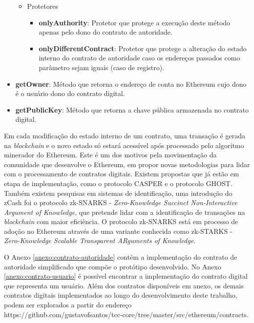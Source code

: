 \documentclass[tcc,capa]{texufpel}
\begin{document}
\begin{itemize}
\begin{itemize}
            \item Protetores
            \begin{itemize}
                \item \textbf{onlyAuthority}: Protetor que protege a execução deste método apenas pelo dono do contrato de autoridade.
                \item \textbf{onlyDifferentContract}: Protetor que protege a alteração do estado interno do contrato de autoridade caso os endereços passados como parâmetro sejam iguais (caso de registro).
            \end{itemize}
        \end{itemize}
        
        \item \textbf{getOwner}: Método que retorna o endereço de conta no Ethereum cujo dono é o usuário dono do contrato digital.
        
        \item \textbf{getPublicKey}: Método que retorna a chave pública armazenada no contrato digital.
    \end{itemize}
    
    Em cada modificação do estado interno de um contrato, uma transação é gerada na \textit{blockchain} e o novo estado só estará acessível após processado pelo algoritmo minerador do Ethereum. Este é um dos motivos pela movimentação da comunidade que desenvolve o Ethereum, em propor novas metodologias para lidar com o processamento de contratos digitais. Existem propostas que já estão em etapa de implementação, como o protocolo CASPER e o protocolo GHOST. Também existem pesquisas em sistemas de identificação, uma introdução do zCash foi o protocolo zk-SNARKS - \textit{Zero-Knowledge Succinct Non-Interactive Argument of Knowledge}, que pretende lidar com a identificação de transações na \textit{blockchain} com maior eficiência. O protocolo zk-SNARKS está em processo de adoção no Ethereum através de uma variante conhecida como zk-STARKS - \textit{Zero-Knowledge Scalable Transparent ARguments of Knowledge}.
    
    O Anexo \ref{anexo:contrato-autoridade} contém a implementação do contrato de autoridade simplificado que compõe o protótipo desenvolvido. No Anexo \ref{anexo:contrato-usuario} é possível encontrar a implementação do contrato digital que representa um usuário. Além dos contratos disponíveis em anexo, os demais contratos digitais implementados ao longo do desenvolvimento deste trabalho, podem ser explorados a partir do endereço https://github.com/gustavofsantos/tcc-core/tree/master/src/ethereum/contracts.
    
\end{document}
